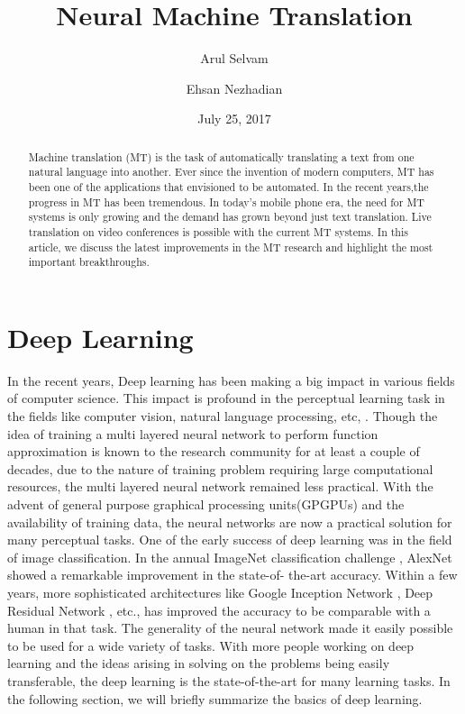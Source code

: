 \documentclass[a4paper]{article}
\begin{document}
\title{Neural Machine Translation}
\author{Arul Selvam}
\author{Ehsan Nezhadian}
\date{July 25, 2017}
\maketitle


\begin{abstract}
Machine translation (MT) is the task of automatically  translating  a  text from
one natural language into another. Ever since the invention of modern computers,
MT  has been  one of the  applications that envisioned  to be automated. In  the
recent years,the  progress in  MT has been  tremendous. In  today's mobile phone
era,  the need for MT systems is only  growing and  the demand  has grown beyond
just text  translation.  Live translation on video conferences  is possible with
the current MT systems. In this article, we discuss the  latest improvements  in
the MT research and highlight the most important breakthroughs.
\end{abstract}


\section{Deep Learning}
In the recent  years,  Deep  learning has  been making a big  impact  in various
fields of computer science. This impact is profound  in  the perceptual learning
task  in  the  fields like computer vision, natural  language  processing,  etc,
\cite{lecun2015deep}. Though the idea of training a multi layered neural network
to perform function  approximation  is  known to the research community  for  at
least  a couple  of  decades\cite{schmidhuber2015deep},  due  to the  nature  of
training  problem  requiring  large computational  resources, the multi  layered
neural  network remained  less  practical. With the  advent  of general  purpose
graphical  processing units(GPGPUs) and  the availability  of training data, the
neural  networks  are now a practical solution for many perceptual tasks. One of
the early success of deep learning was in  the field of image classification. In
the  annual ImageNet classification  challenge \cite{deng2009imagenet},  AlexNet
\cite{krizhevsky2012imagenet} showed a  remarkable improvement  in the state-of-
the-art  accuracy.  Within  a  few years, more sophisticated  architectures like
Google  Inception  Network \cite{szegedy2016rethinking},  Deep  Residual Network
\cite{he2016deep}, etc., has improved the accuracy to be comparable with a human
in that task. The generality of the neural network made it easily possible to be
used for a wide variety of tasks. With more people  working on deep learning and
the ideas arising in solving on the problems being easily transferable, the deep
learning  is the  state-of-the-art for  many learning  tasks. In  the  following
section, we will briefly summarize the basics of deep learning.
\end{document}
